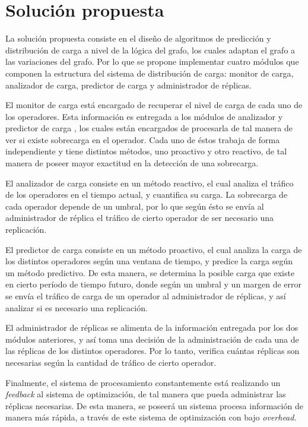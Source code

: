 \section{Solución propuesta}
\label{intro:solucion}

La solución propuesta consiste en el dise\~no de algoritmos de predicci\'on y distribuci\'on de carga a nivel de la l\'ogica del grafo, los cuales adaptan el grafo a las variaciones del grafo. Por lo que se propone implementar cuatro módulos que componen la estructura del sistema de distribución de carga: monitor de carga, analizador de carga, predictor de carga y administrador de réplicas.

El monitor de carga está encargado de recuperar el nivel de carga de cada uno de los operadores. Esta información es entregada a los módulos de analizador y predictor de carga , los cuales están encargados de procesarla de tal manera de ver si existe sobrecarga en el operador. Cada uno de éstos trabaja de forma independiente y tiene distintos métodos, uno proactivo y otro reactivo, de tal manera de poseer mayor exactitud en la detección de una sobrecarga.

El analizador de carga consiste en un método reactivo, el cual analiza el tráfico de los operadores en el tiempo actual, y cuantifica su carga. La sobrecarga de cada operador depende de un umbral, por lo que según ésto se envía al administrador de réplica el tráfico de cierto operador de ser necesario una replicación.

El predictor de carga consiste en un método proactivo, el cual analiza la carga de los distintos operadores según una ventana de tiempo, y predice la carga según un método predictivo. De esta manera, se determina la posible carga que existe en cierto período de tiempo futuro, donde según un umbral y un margen de error se envía el tráfico de carga de un operador al administrador de réplicas, y así analizar si es necesario una replicación.

El administrador de réplicas se alimenta de la información entregada por los dos módulos anteriores, y así toma una decisión de la administración de cada una de las réplicas de los distintos operadores. Por lo tanto, verifica cuántas réplicas son necesarias según la cantidad de tráfico de cierto operador.

Finalmente, el sistema de procesamiento constantemente está realizando un \textit{feedback} al sistema de optimización, de tal manera que pueda administrar las réplicas necesarias. De esta manera, se poseerá un sistema procesa información de manera más rápida, a través de este sistema de optimización con bajo \textit{overhead}.


